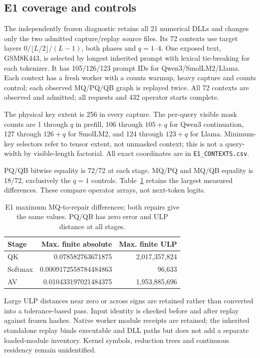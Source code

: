 

\subsection{E1 coverage and controls}
The independently frozen diagnostic retains all 21 numerical DLLs and changes only the two admitted capture/replay source files. Its 72 contexts use target layers $0/\lfloor L/2\rfloor/(L-1)$, both phases and $q=1$--4. One exposed text, GSM8K443, is selected by longest inherited prompt with lexical tie-breaking for each tokenizer. It has 105/126/123 prompt IDs for Qwen3/SmolLM2/Llama. Each context has a fresh worker with a counts warmup, heavy capture and counts control; each observed MQ/PQ/QB graph is replayed twice. All 72 contexts are observed and admitted; all requests and 432 operator starts complete.

The physical key extent is 256 in every capture. The per-query visible mask counts are 1 through $q$ in prefill, 106 through $105+q$ for Qwen3 continuation, 127 through $126+q$ for SmolLM2, and 124 through $123+q$ for Llama. Minimum-key selectors refer to tensor extent, not unmasked context; this is not a query-width by visible-length factorial. All exact coordinates are in \texttt{E1\_CONTEXTS.csv}.

PQ/QB bitwise equality is 72/72 at each stage. MQ/PQ and MQ/QB equality is 18/72, exclusively the $q=1$ controls. Table~\ref{tab:e1errors} retains the largest measured differences. These compare operator arrays, not next-token logits.
\begin{table}[t]\centering\small
\caption{E1 maximum MQ-to-repair differences; both repairs give the same values. PQ/QB has zero error and ULP distance at all stages.}\label{tab:e1errors}
\begin{tabular}{lrr}\toprule
Stage&Max. finite absolute&Max. finite ULP\\\midrule
QK&0.078582763671875&2,017,357,824\\
Softmax&0.0009172558784484863&96,633\\
AV&0.010433197021484375&1,953,885,696\\\bottomrule
\end{tabular}\end{table}

Large ULP distances near zero or across signs are retained rather than converted into a tolerance-based pass. Input identity is checked before and after replay against frozen hashes. Native worker module receipts are retained; the inherited standalone replay binds executable and DLL paths but does not add a separate loaded-module inventory. Kernel symbols, reduction trees and continuous residency remain unidentified.

